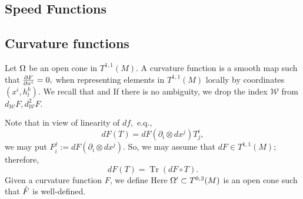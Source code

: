 \subsection{Speed Functions}
\label{subsec:bg_speed}
\subsection*{Curvature functions}
Let $\O$ be an open cone in $T^{1,1}(M).$ A curvature function is a smooth map
such that $\fr{\del F}{\del x^i}=0,$ when representing elements in $T^{1,1}(M)$ locally by coordinates $(x^i,h^k_l)$.
We recall that
and
If there is no ambiguity, we drop the index $\mathcal{W}$ from $d_\mathcal{W}F, d^2_\mathcal{W}F.$

Note that in view of linearity of $df,$ e.q.,
\[dF(T)=dF(\partial_i\otimes dx^j)T_j^i,\]
we may put $F^j_i:=dF(\partial_i\otimes dx^j)$. So, we may assume that $dF\in T^{1,1}(M);$ therefore,
\[dF(T)=\operatorname{Tr}(dF\circ T).\]
Given a curvature function $F$, we define
Here $\O'\sub T^{0,2}(M)$ is an open cone such that $\~F$ is well-defined.

